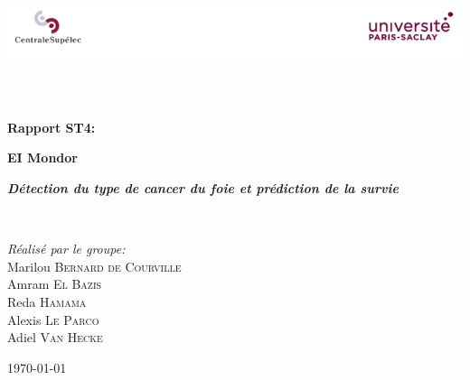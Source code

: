 \begin{titlepage}
\begin{center}

\includegraphics[width=\textwidth]{./logo}~\\[1cm]


\textsc{\Large }\\[0.5cm]

\HRule \\[0.4cm]

{\huge \bfseries Rapport ST4:\\
[0.4cm] }

{\large \bfseries EI Mondor\\[0.4cm] }

{\large \bfseries \textit{Détection du type de cancer du foie et prédiction de la survie}\\[0.4cm] }


\HRule \\[1.5cm]

\vspace{3cm}

\begin{minipage}{0.4\textwidth}
\begin{flushleft} \large
\emph{Réalisé par le groupe:}\\
	Marilou \textsc{Bernard de Courville}\\
	Amram \textsc{El Bazis}\\
	Reda \textsc{Hamama}\\
	Alexis \textsc{Le Parco}\\
	Adiel \textsc{Van Hecke}\\
\end{flushleft}

\end{minipage}


\vfill

{\large \today}

\end{center}
\end{titlepage}
